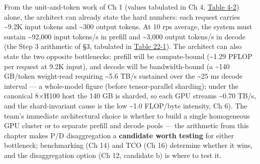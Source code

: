 From the unit-and-token work of Ch 1 (values tabulated in Ch 4, \hyperref[tab:4.2]{Table 4-2}) alone, the architect can already state the hard numbers: each
request carries \textasciitilde9.2K input tokens and \textasciitilde300
output tokens. At 10 rps average, the system must sustain
\textasciitilde92,000 input tokens/s in prefill and \textasciitilde3,000
output tokens/s in decode (the Step 3 arithmetic of §3, tabulated in
\hyperref[tab:22.1]{Table 22-1}). The architect can also state the two opposite bottlenecks:
prefill will be compute-bound (\textasciitilde1.29 PFLOP per request at
9.2K input), and decode will be bandwidth-bound (a \textasciitilde140
GB/token weight-read requiring \textasciitilde5.6 TB/s sustained over
the \textasciitilde25 ms decode interval --- a whole-model figure
(before tensor-parallel sharding); under the canonical 8×H100 host the
140 GB is sharded, so each GPU streams \textasciitilde0.70 TB/s, and the
shard-invariant cause is the low \textasciitilde1.0 FLOP/byte intensity,
Ch 6). The team's immediate architectural choice is whether to build a
single homogeneous GPU cluster or to separate prefill and decode pools
--- the arithmetic from this chapter makes P/D disaggregation a
\textbf{candidate worth testing} for either bottleneck; benchmarking (Ch
14) and TCO (Ch 16) determine whether it wins, and the disaggregation
option (Ch 12, candidate b) is where to test it.

